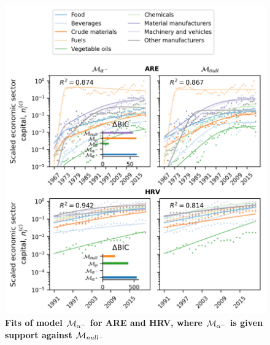 \FloatBarrier
\begin{figure}
  \center
  \includegraphics{figures/SI/figure_alphan_simulate.png}
  \caption{\small \textbf{Fits of model $\mathcal{M}_{\alpha^-}$ for ARE and HRV, where $\mathcal{M}_{\alpha^-}$ is given support against $\mathcal{M}_{null}$}. 
   }\label{figSI:fit_alphan}
\end{figure}

